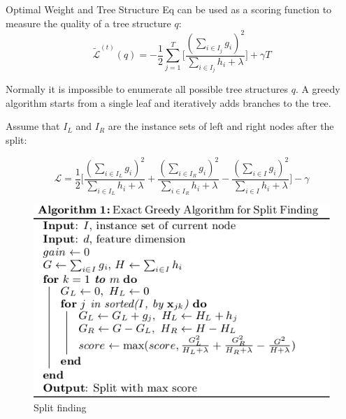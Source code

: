 \documentclass{beamer}
\begin{document}
\begin{frame}{Optimal Weight and Tree Structure}
	Eq  can be used as a scoring function to measure the quality of a tree structure $q$:
	\begin{equation*}
	\tilde{\mathcal{L}}^{(t)}(q) = - \frac{1}{2} \sum_{j=1}^{T}
	\big[  \frac{(\sum_{i \in I_j}g_i )^2}{ \sum_{i \in I_j} h_i + \lambda }
	\big]
	+ \gamma T
	\end{equation*}
	
	Normally it is impossible to enumerate all possible tree structures $q$. A  greedy algorithm starts from a single leaf and iteratively adds branches to the tree.
	
	Assume that $I_L$ and $I_R$ are the instance sets of left and right nodes after the split:
	
	\begin{equation}
	\mathcal{L} = 
	\frac{1}{2} \Big[ \frac{(\sum_{i \in I_L}g_i)^2}{\sum_{i \in I_L} h_i + \lambda } +
		\frac{(\sum_{i \in I_R}g_i)^2}{\sum_{i \in I_R} h_i + \lambda } -
		\frac{(\sum_{i \in I}g_i)^2}{\sum_{i \in I} h_i + \lambda } 
	\Big] - \gamma
	\end{equation}
	
\end{frame}

\begin{frame}
	

\begin{figure}
\centering
\includegraphics[width=0.7\linewidth]{img/exact_alg}
\caption{Split finding}
\label{fig:exact_alg}
\end{figure}	
\end{frame}
\end{document}
